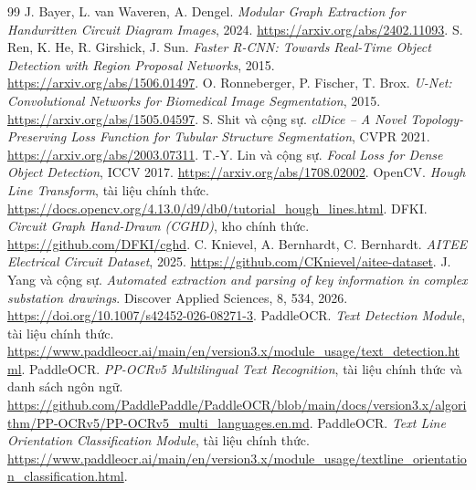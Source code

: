 \documentclass[11pt,a4paper]{article}
\begin{document}
\begin{thebibliography}{99}
\small
{}
J. Bayer, L. van Waveren, A. Dengel.
\emph{Modular Graph Extraction for Handwritten Circuit Diagram Images}, 2024.
\url{https://arxiv.org/abs/2402.11093}.
S. Ren, K. He, R. Girshick, J. Sun.
\emph{Faster R-CNN: Towards Real-Time Object Detection with Region Proposal Networks}, 2015.
\url{https://arxiv.org/abs/1506.01497}.
O. Ronneberger, P. Fischer, T. Brox.
\emph{U-Net: Convolutional Networks for Biomedical Image Segmentation}, 2015.
\url{https://arxiv.org/abs/1505.04597}.
S. Shit và cộng sự.
\emph{clDice -- A Novel Topology-Preserving Loss Function for Tubular Structure Segmentation}, CVPR 2021.
\url{https://arxiv.org/abs/2003.07311}.
T.-Y. Lin và cộng sự.
\emph{Focal Loss for Dense Object Detection}, ICCV 2017.
\url{https://arxiv.org/abs/1708.02002}.
OpenCV. \emph{Hough Line Transform}, tài liệu chính thức.
\url{https://docs.opencv.org/4.13.0/d9/db0/tutorial_hough_lines.html}.
DFKI. \emph{Circuit Graph Hand-Drawn (CGHD)}, kho chính thức.
\url{https://github.com/DFKI/cghd}.
C. Knievel, A. Bernhardt, C. Bernhardt.
\emph{AITEE Electrical Circuit Dataset}, 2025.
\url{https://github.com/CKnievel/aitee-dataset}.
J. Yang và cộng sự.
\emph{Automated extraction and parsing of key information in complex substation drawings}.
Discover Applied Sciences, 8, 534, 2026.
\url{https://doi.org/10.1007/s42452-026-08271-3}.
PaddleOCR. \emph{Text Detection Module}, tài liệu chính thức.
\url{https://www.paddleocr.ai/main/en/version3.x/module_usage/text_detection.html}.
PaddleOCR. \emph{PP-OCRv5 Multilingual Text Recognition}, tài liệu chính thức và danh sách ngôn ngữ.
\url{https://github.com/PaddlePaddle/PaddleOCR/blob/main/docs/version3.x/algorithm/PP-OCRv5/PP-OCRv5_multi_languages.en.md}.
PaddleOCR. \emph{Text Line Orientation Classification Module}, tài liệu chính thức.
\url{https://www.paddleocr.ai/main/en/version3.x/module_usage/textline_orientation_classification.html}.
\end{thebibliography}
\end{document}

